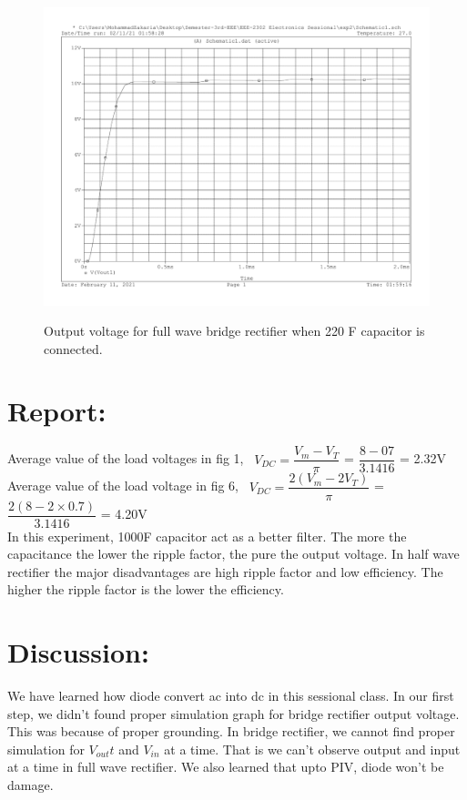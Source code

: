 \documentclass{article}
\begin{document}
	
	\begin{figure}[!htb]
		\centering
		\includegraphics[width=0.7\linewidth]{Vout1-for-bride-fullwave-with-220ufd-capacitor.pdf}
		\caption{}
		\label{fig:vout1} Output voltage for full wave bridge rectifier when 220 \textmu F capacitor is connected.
	\end{figure}

\section{Report:}
Average value of the load voltages in fig 1, \
$V_{DC} = \dfrac{V_m -V_T}{\pi}$ = $ \dfrac{8-07}{3.1416} $ = 2.32V \\

Average value of the load voltage in fig 6, \ $V_{DC} = \dfrac{2(V_m -2V_T)}{\pi}$ = $ \dfrac{2(8-2 \times0.7)}{3.1416} $ = 4.20V \\

In this experiment, 1000\textmu F capacitor act as a better filter. The more the capacitance the lower the ripple factor, the pure the output voltage. In half wave rectifier the major disadvantages are high ripple factor and low efficiency. The higher the ripple factor is the lower the efficiency.

\section{Discussion:} We have learned how diode convert ac into dc in this sessional class. In our first step, we didn't found proper simulation graph for bridge rectifier output voltage. This was because of proper grounding. In bridge rectifier, we cannot find proper simulation for $V_{out}t$ and $V_{in}$ at a time. That is we can't observe output and input at a time in full wave rectifier. We also learned that upto PIV, diode won't be damage.

	
\end{document}
